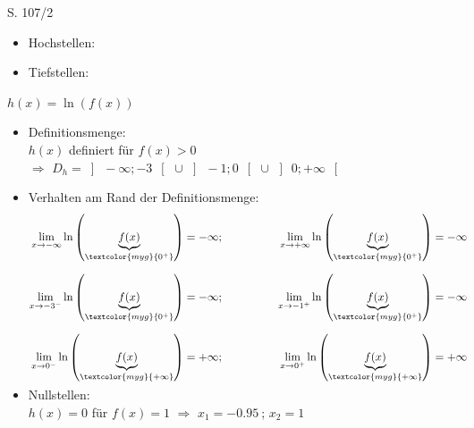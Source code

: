 \begin{Exercise}{S. 107/2}{}
\begin{enumerate}[label=\arabic*.,leftmargin=*]
{\begin{itemize}[leftmargin=*]
{                \begin{itemize}
                    \item Hochstellen: 
                    \item Tiefstellen: \\
                \end{itemize}
                }
        \end{itemize}
        $h(x) =  \ln\left(f(x)\right)$ \\[-3.0ex] 
        \begin{itemize}[leftmargin=*]
            \item Definitionsmenge: \\[1.0ex]{
                $h(x)$ definiert für $f(x) > 0$\\[1.0ex]
                $\Rightarrow$ \quad $D_{h} = \left] \ -\infty; -3 \ \right[$ \quad $\cup$ \quad $\left] \ -1; 0 \ \right[$ \quad $\cup$ \quad $\left] \ 0; +\infty \ \right[$\\[-2.0ex]
                }
            \item Verhalten am Rand der Definitionsmenge: \\[-2.0ex]{
                \begin{align*}
                    \lim\limits_{x \to -\infty} \ln\left(\underbrace{f(x)}_{\textcolor{myg}{0^{+}}}\right) &= - \infty; \qquad \qquad &\lim\limits_{x \to +\infty} \ln\left(\underbrace{f(x)}_{\textcolor{myg}{0^{+}}}\right) &= - \infty  && \\[1.5ex]
                    \lim\limits_{x \to -3^{-}} \ln\left(\underbrace{f(x)}_{\textcolor{myg}{0^{+}}}\right) &= - \infty; \qquad \qquad &\lim\limits_{x \to -1^{+}} \ln\left(\underbrace{f(x)}_{\textcolor{myg}{0^{+}}}\right) &= - \infty && \\[1.5ex]
                    \lim\limits_{x \to 0^{-}} \ln\left(\underbrace{f(x)}_{\textcolor{myg}{+\infty}}\right) &= + \infty; \qquad \qquad &\lim\limits_{x \to 0^{+}} \ln\left(\underbrace{f(x)}_{\textcolor{myg}{+\infty}}\right) &= + \infty && \\[-2.0ex]
                \end{align*}
                }
            \item Nullstellen: \\[1.0ex]{
                $h(x) = 0$ für $f(x) = 1$ \qquad $\Rightarrow$ \quad $x_{1} = \SI{-0.95}{}$; \quad $x_{2} = 1$\\[-2.0ex]
}
\end{itemize}}
\end{enumerate}
\end{Exercise}

